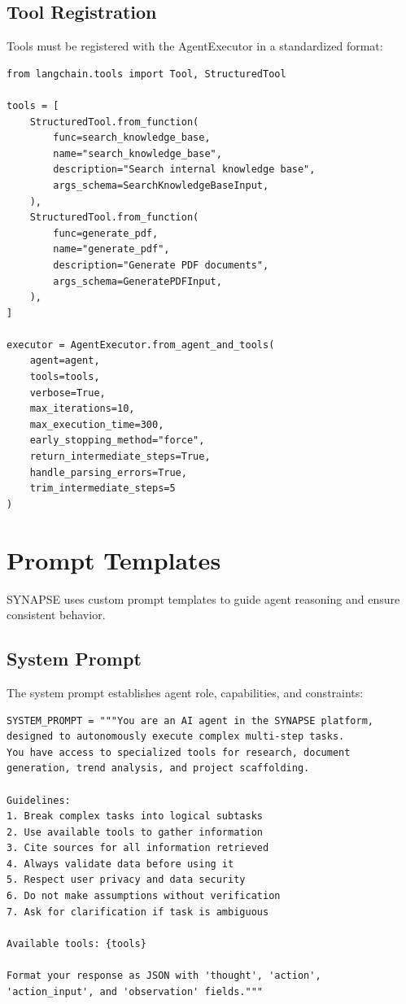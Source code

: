 \documentclass{report}
\begin{document}
\subsection{Tool Registration}

Tools must be registered with the AgentExecutor in a standardized format:

\begin{lstlisting}
from langchain.tools import Tool, StructuredTool

tools = [
    StructuredTool.from_function(
        func=search_knowledge_base,
        name="search_knowledge_base",
        description="Search internal knowledge base",
        args_schema=SearchKnowledgeBaseInput,
    ),
    StructuredTool.from_function(
        func=generate_pdf,
        name="generate_pdf",
        description="Generate PDF documents",
        args_schema=GeneratePDFInput,
    ),
]

executor = AgentExecutor.from_agent_and_tools(
    agent=agent,
    tools=tools,
    verbose=True,
    max_iterations=10,
    max_execution_time=300,
    early_stopping_method="force",
    return_intermediate_steps=True,
    handle_parsing_errors=True,
    trim_intermediate_steps=5
)
\end{lstlisting}

\section{Prompt Templates}

SYNAPSE uses custom prompt templates to guide agent reasoning and ensure consistent behavior.

\subsection{System Prompt}

The system prompt establishes agent role, capabilities, and constraints:

\begin{lstlisting}
SYSTEM_PROMPT = """You are an AI agent in the SYNAPSE platform,
designed to autonomously execute complex multi-step tasks.
You have access to specialized tools for research, document
generation, trend analysis, and project scaffolding.

Guidelines:
1. Break complex tasks into logical subtasks
2. Use available tools to gather information
3. Cite sources for all information retrieved
4. Always validate data before using it
5. Respect user privacy and data security
6. Do not make assumptions without verification
7. Ask for clarification if task is ambiguous

Available tools: {tools}

Format your response as JSON with 'thought', 'action',
'action_input', and 'observation' fields."""
\end{lstlisting}
\end{document}
